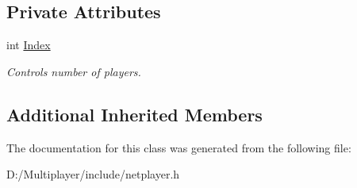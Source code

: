 \subsection*{Private Attributes}
\begin{DoxyCompactItemize}
\item 
\mbox{\label{class_net_player_ac5eef0177a8500703903df1280834d67}} 
int \hyperlink{class_net_player_ac5eef0177a8500703903df1280834d67}{Index}
\begin{DoxyCompactList}\small\item\em Controls number of players. \end{DoxyCompactList}\end{DoxyCompactItemize}
\subsection*{Additional Inherited Members}


The documentation for this class was generated from the following file\+:\begin{DoxyCompactItemize}
\item 
D\+:/\+Multiplayer/include/netplayer.\+h\end{DoxyCompactItemize}
